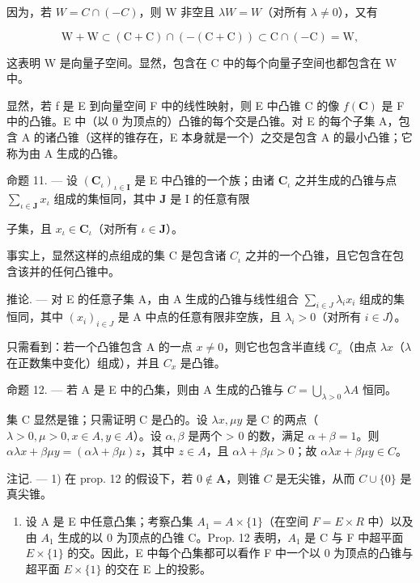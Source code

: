 因为，若 \(W = C \cap (-C)\)，则 W 非空且 \(\lambda W = W\)（对所有 \(\lambda \neq 0\)），又有

\[
\mathrm{W} + \mathrm{W} \subset (\mathrm{C} + \mathrm{C}) \cap (- (\mathrm{C} + \mathrm{C})) \subset \mathrm{C} \cap (- \mathrm{C}) = \mathrm{W},
\]

这表明 W 是向量子空间。显然，包含在 C 中的每个向量子空间也都包含在 W 中。

显然，若 f 是 E 到向量空间 F 中的线性映射，则 E 中凸锥 C 的像 \(f(\mathbf{C})\) 是 F 中的凸锥。E 中（以 0 为顶点的）凸锥的每个交是凸锥。对 E 的每个子集 A，包含 A 的诸凸锥（这样的锥存在，E 本身就是一个）之交是包含 A 的最小凸锥；它称为由 A 生成的凸锥。

命题 11. --- 设 \((\mathbf{C}_{\iota})_{\iota \in \mathbf{I}}\) 是 E 中凸锥的一个族；由诸 \(\mathbf{C}_{\iota}\) 之并生成的凸锥与点 \(\sum_{\iota \in \mathbf{J}} x_{\iota}\) 组成的集恒同，其中 \(\mathbf{J}\) 是 I 的任意有限

子集，且 \(x_{\iota} \in \mathbf{C}_{\iota}\)（对所有 \(\iota \in \mathbf{J}\)）。

事实上，显然这样的点组成的集 C 是包含诸 \(C_{\iota}\) 之并的一个凸锥，且它包含在包含该并的任何凸锥中。

推论. --- 对 E 的任意子集 A，由 A 生成的凸锥与线性组合 \(\sum_{i\in J}\lambda_{i}x_{i}\) 组成的集恒同，其中 \((x_{i})_{i\in J}\) 是 A 中点的任意有限非空族，且 \(\lambda_{i}>0\)（对所有 \(i\in J\)）。

只需看到：若一个凸锥包含 A 的一点 \(x \neq 0\)，则它也包含半直线 \(C_{x}\)（由点 \(\lambda x\)（\(\lambda\) 在正数集中变化）组成），并且 \(C_{x}\) 是凸锥。

命题 12. --- 若 A 是 E 中的凸集，则由 A 生成的凸锥与 \(C = \bigcup_{\lambda > 0} \lambda A\) 恒同。

集 C 显然是锥；只需证明 C 是凸的。设 \(\lambda x, \mu y\) 是 C 的两点（\(\lambda > 0, \mu > 0, x \in A, y \in A\)）。设 \(\alpha, \beta\) 是两个 \textgreater{} 0 的数，满足 \(\alpha + \beta = 1\)。则 \(\alpha \lambda x + \beta \mu y = (\alpha \lambda + \beta \mu) z\)，其中 \(z \in A\)，且 \(\alpha \lambda + \beta \mu > 0\)；故 \(\alpha \lambda x + \beta \mu y \in C\)。

注记. --- 1) 在 prop. 12 的假设下，若 \(0 \notin \mathbf{A}\)，则锥 \(C\) 是无尖锥，从而 \(C \cup \{0\}\) 是真尖锥。

\begin{enumerate}
\def\labelenumi{\arabic{enumi})}
\setcounter{enumi}{1}
\tightlist
\item
  设 A 是 E 中任意凸集；考察凸集 \(A_{1} = A \times \{1\}\)（在空间 \(F = E \times R\) 中）以及由 \(A_{1}\) 生成的以 0 为顶点的凸锥 C。Prop. 12 表明，\(A_{1}\) 是 C 与 F 中超平面 \(E \times \{1\}\) 的交。因此，E 中每个凸集都可以看作 F 中一个以 0 为顶点的凸锥与超平面 \(E \times \{1\}\) 的交在 E 上的投影。
\end{enumerate}

